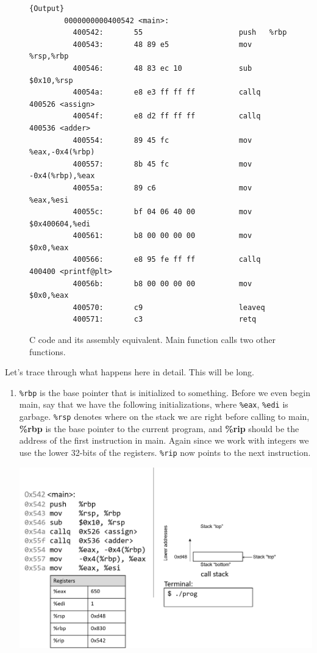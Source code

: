 \begin{example}
\begin{figure}[H]
\begin{minipage}{.74\textwidth}
\begin{lstlisting}[]{Output}
        0000000000400542 <main>:
          400542:       55                      push   %rbp
          400543:       48 89 e5                mov    %rsp,%rbp
          400546:       48 83 ec 10             sub    $0x10,%rsp
          40054a:       e8 e3 ff ff ff          callq  400526 <assign>
          40054f:       e8 d2 ff ff ff          callq  400536 <adder>
          400554:       89 45 fc                mov    %eax,-0x4(%rbp)
          400557:       8b 45 fc                mov    -0x4(%rbp),%eax
          40055a:       89 c6                   mov    %eax,%esi
          40055c:       bf 04 06 40 00          mov    $0x400604,%edi
          400561:       b8 00 00 00 00          mov    $0x0,%eax
          400566:       e8 95 fe ff ff          callq  400400 <printf@plt>
          40056b:       b8 00 00 00 00          mov    $0x0,%eax
          400570:       c9                      leaveq
          400571:       c3                      retq
      \end{lstlisting}
      \end{minipage}
      \caption{C code and its assembly equivalent. Main function calls two other functions. } 
      \label{fig:calling_functions}
    \end{figure}

    Let's trace through what happens here in detail. This will be long. 

    \begin{enumerate}
      \item \texttt{\%rbp} is the base pointer that is initialized to something. Before we even begin main, say that we have the following initializations, where \texttt{\%eax}, \texttt{\%edi} is garbage. \texttt{\%rsp} denotes where on the stack we are right before calling to main, \textbf{\%rbp} is the base pointer to the current program, and \textbf{\%rip} should be the address of the first instruction in main. Again since we work with integers we use the lower 32-bits of the registers. \texttt{\%rip} now points to the next instruction. 
        \begin{center}
          \includegraphics[scale=0.5]{img/Slide1.png}
        \end{center}  


\end{enumerate}
\end{example}
